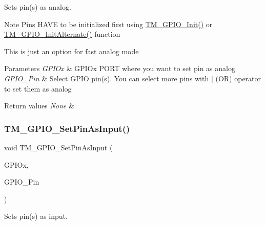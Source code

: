Sets pin(s) as analog. 

\begin{DoxyNote}{Note}
Pins H\+A\+VE to be initialized first using \hyperlink{group___t_m___g_p_i_o___functions_ga7ea61719f45c8d46e56f636d7ffdf0d0}{T\+M\+\_\+\+G\+P\+I\+O\+\_\+\+Init()} or \hyperlink{group___t_m___g_p_i_o___functions_gac91349d1bf42b50463ebc2716130eb89}{T\+M\+\_\+\+G\+P\+I\+O\+\_\+\+Init\+Alternate()} function 

This is just an option for fast analog mode 
\end{DoxyNote}

\begin{DoxyParams}{Parameters}
{\em G\+P\+I\+Ox} & G\+P\+I\+Ox P\+O\+RT where you want to set pin as analog \\
\hline
{\em G\+P\+I\+O\+\_\+\+Pin} & Select G\+P\+IO pin(s). You can select more pins with $\vert$ (OR) operator to set them as analog \\
\hline
\end{DoxyParams}

\begin{DoxyRetVals}{Return values}
{\em None} & \\
\hline
\end{DoxyRetVals}
\mbox{\label{group___t_m___g_p_i_o___functions_ga9c5ca4f894b1f46d413d2bfc692fcf43}} 
\subsubsection{\texorpdfstring{T\+M\+\_\+\+G\+P\+I\+O\+\_\+\+Set\+Pin\+As\+Input()}{TM\_GPIO\_SetPinAsInput()}}
{\footnotesize\ttfamily void T\+M\+\_\+\+G\+P\+I\+O\+\_\+\+Set\+Pin\+As\+Input (\begin{DoxyParamCaption}\item[{G\+P\+I\+O\+\_\+\+Type\+Def $\ast$}]{G\+P\+I\+Ox,  }\item[{uint16\+\_\+t}]{G\+P\+I\+O\+\_\+\+Pin }\end{DoxyParamCaption})}



Sets pin(s) as input. 

